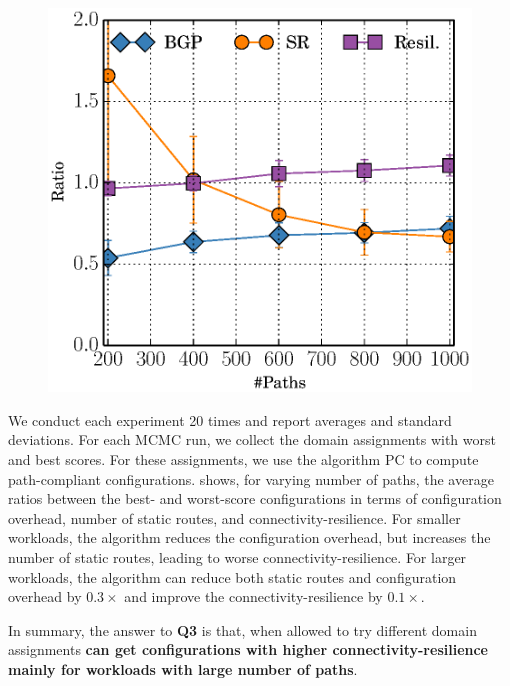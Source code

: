 \begin{figure}
\vspace{-2.5mm}
	\includegraphics[width=0.29\columnwidth]{figures/ratioMCMC.eps}
\end{figure}
We conduct each experiment 20 times and report averages and standard
deviations.  For each MCMC run, we collect the domain assignments with
worst and best scores.  For these assignments, we use the algorithm PC
to compute path-compliant configurations.
 shows, for varying number of paths, the average ratios
between the best- and worst-score configurations
in terms of
configuration overhead, number of static routes, and 
connectivity-resilience.
For smaller workloads, 
the algorithm reduces the configuration overhead, but increases
the number of static routes, leading to worse connectivity-resilience. For 
larger workloads, the algorithm can
reduce both static routes 
and configuration overhead by $0.3\times$
and improve the connectivity-resilience 
by $0.1\times$.

In summary, the answer to \textbf{Q3} is that,
when allowed to try different domain assignments
\textbf{\name can get configurations with higher connectivity-resilience mainly for workloads with large number of paths}.
